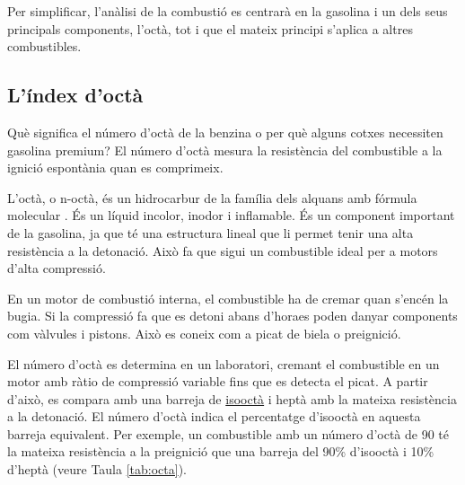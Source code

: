 Per simplificar, l'anàlisi de la combustió es centrarà en la gasolina i un dels seus principals components, l'octà, tot i que el mateix principi s'aplica a altres combustibles.

\subsection{L'índex d'octà}

    Què significa el número d'octà de la benzina o per què alguns cotxes necessiten gasolina premium? El número d'octà mesura la resistència del combustible a la ignició espontània quan es comprimeix.

    L'octà, o n-octà, és un hidrocarbur de la família dels alquans amb fórmula molecular . És un líquid incolor, inodor i inflamable. És un component important de la gasolina, ja que té una estructura lineal que li permet tenir una alta resistència a la detonació. Això fa que sigui un combustible ideal per a motors d'alta compressió.

En un motor de combustió interna, el combustible ha de cremar quan s'encén la bugia. Si la compressió fa que es detoni abans d'horaes poden danyar components com vàlvules i pistons. Això es coneix com a picat de biela o preignició.

El número d'octà es determina en un laboratori, cremant el combustible en un motor amb ràtio de compressió variable fins que es detecta el picat. A partir d'això, es compara amb una barreja de \href{https://www.ebi.ac.uk/chebi/searchId.do?printerFriendlyView=true&chebiId=62805&structureView=applet}{isooctà} i heptà amb la mateixa resistència a la detonació. El número d'octà indica el percentatge d'isooctà en aquesta barreja equivalent. Per exemple, un combustible amb un número d'octà de 90 té la mateixa resistència a la preignició que una barreja del 90\% d'isooctà i 10\% d'heptà (veure Taula \ref{tab:octa}).

